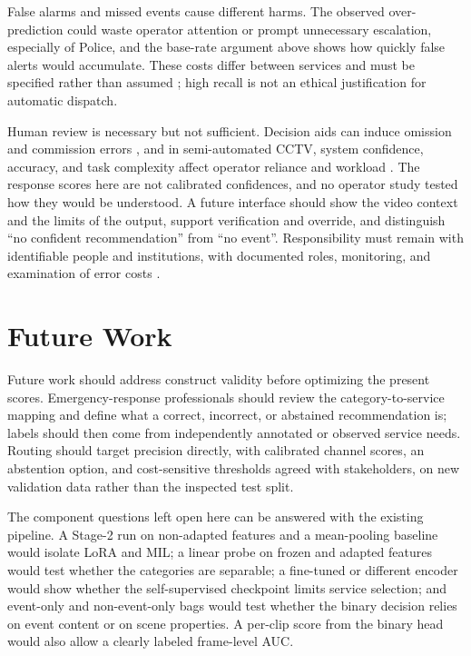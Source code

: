 False alarms and missed events cause different harms. The observed
over-prediction could waste operator attention or prompt unnecessary
escalation, especially of Police, and the base-rate argument above shows how
quickly false alerts would accumulate. These costs differ between services and
must be specified rather than assumed \cite{elkan2001foundations}; high recall is
not an ethical justification for automatic dispatch.

Human review is necessary but not sufficient. Decision aids can induce omission
and commission errors \cite{mosier1998automation}, and in semi-automated CCTV,
system confidence, accuracy, and task complexity affect operator reliance and
workload \cite{dadashi2013semiautomated}. The response scores here are not
calibrated confidences, and no operator study tested how they would be
understood. A future interface should show the video context and the limits of
the output, support verification and override, and distinguish ``no confident
recommendation'' from ``no event''. Responsibility must remain with identifiable
people and institutions, with documented roles, monitoring, and examination of
error costs \cite{tabassi2023airmf}.

\section{Future Work}
\label{sec:discussion-future}

Future work should address construct validity before optimizing the present
scores. Emergency-response professionals should review the category-to-service
mapping and define what a correct, incorrect, or abstained recommendation is;
labels should then come from independently annotated or observed service needs.
Routing should target precision directly, with calibrated channel scores, an
abstention option, and cost-sensitive thresholds agreed with stakeholders, on
new validation data rather than the inspected test split.

The component questions left open here can be answered with the existing
pipeline. A Stage-2 run on non-adapted features and a mean-pooling baseline
would isolate LoRA and MIL; a linear probe on frozen and adapted features would
test whether the categories are separable; a fine-tuned or different encoder
would show whether the self-supervised checkpoint limits service selection; and
event-only and non-event-only bags would test whether the binary decision relies
on event content or on scene properties. A per-clip score from the binary head
would also allow a clearly labeled frame-level AUC.

